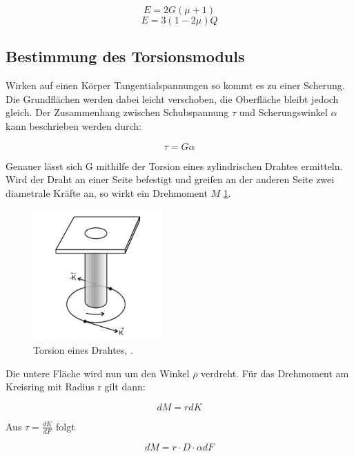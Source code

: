 \begin{equation}
	E = 2G(\mu + 1)
\end{equation}
\begin{equation}
	E = 3(1-2\mu)Q
\end{equation}

\subsection{Bestimmung des Torsionsmoduls}\label{sec:torsionsmodul}

Wirken auf einen Körper Tangentialspannungen so kommt es zu einer Scherung. Die Grundflächen werden dabei leicht verschoben, die Oberfläche bleibt jedoch gleich. Der Zusammenhang zwischen Schubspannung $\tau$ und Scherungswinkel $\alpha$ kann beschrieben werden durch:

\begin{equation}
	\tau = G \alpha
\end{equation}

Genauer lässt sich G mithilfe der Torsion eines zylindrischen Drahtes ermitteln.
Wird der Draht an einer Seite befestigt und greifen an der anderen Seite zwei diametrale Kräfte an, so wirkt ein Drehmoment $M$ \ref{fig:Torsion}.

\begin{figure}[h]
  \centering
  \includegraphics[height=5cm]{Grafiken/Torsion.pdf}
  \caption{Torsion eines Drahtes, \cite{1}.}
  \label{fig:Torsion}
\end{figure}

Die untere Fläche wird nun um den Winkel $\rho$ verdreht. Für das Drehmoment am Kreisring mit Radius r gilt dann:

\begin{equation}
	dM = r dK
\end{equation}

Aus $\tau = \frac{dK}{dF}$ folgt 

\begin{equation}
	dM = r\cdot D\cdot \alpha dF
\end{equation}

